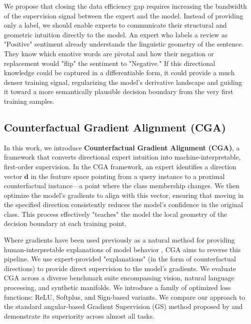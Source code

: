 \documentclass[sigconf,anonymous]{aamas}
\begin{document}
We propose that closing the data efficiency gap requires increasing the bandwidth of the supervision signal between the expert and the model. Instead of providing only a label, we should enable experts to communicate their structural and geometric intuition directly to the model. An expert who labels a review as "Positive" sentiment already understands the linguistic geometry of the sentence. They know which emotive words are pivotal and how their negation or replacement would "flip" the sentiment to "Negative." If this directional knowledge could be captured in a differentiable form, it could provide a much denser training signal, regularizing the model's derivative landscape and guiding it toward a more semantically plausible decision boundary from the very first training samples.

\subsection{Counterfactual Gradient Alignment (CGA)}
In this work, we introduce \textbf{Counterfactual Gradient Alignment (CGA)}, a framework that converts directional expert intuition into machine-interpretable, first-order supervision. In the CGA framework, an expert identifies a direction vector $\mathbf{d}$ in the feature space pointing from a query instance to a proximal counterfactual instance---a point where the class membership changes. We then optimize the model's gradients to align with this vector, ensuring that moving in the specified direction consistently reduces the model's confidence in the original class. This process effectively "teaches" the model the local geometry of the decision boundary at each training point.

Where gradients have been used previously as a natural method for providing human-interpretable explanations of model behavior \cite{simonyan2013deep}, CGA aims to reverse this pipeline. We use expert-provided "explanations" (in the form of counterfactual directions) to provide direct supervision to the model's gradients. We evaluate CGA across a diverse benchmark suite encompassing vision, natural language processing, and synthetic manifolds. We introduce a family of optimized loss functions: ReLU, Softplus, and Sign-based variants. We compare our approach to the standard angular-based Gradient Supervision (GS) method proposed by \cite{teney2020learning} and demonstrate its superiority across almost all tasks.
\end{document}
